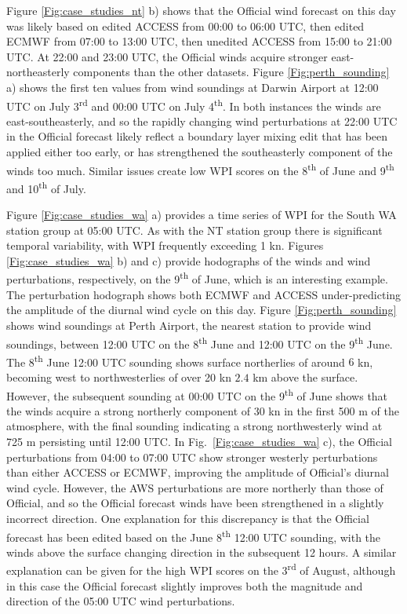 \documentclass[twocol]{ametsoc}
\begin{document}
Figure \ref{Fig:case_studies_nt} b) shows that the Official wind forecast on this day was likely based on edited ACCESS from 00:00 to 06:00 UTC, then edited ECMWF from 07:00 to 13:00 UTC, then unedited ACCESS from 15:00 to 21:00 UTC. At 22:00 and 23:00 UTC, the Official winds acquire stronger east-northeasterly components than the other datasets. Figure \ref{Fig:perth_sounding} a) shows the first ten values from wind soundings at Darwin Airport at 12:00 UTC on July 3\textsuperscript{rd} and 00:00 UTC on July 4\textsuperscript{th}. In both instances the winds are east-southeasterly, and so the rapidly changing wind perturbations at 22:00 UTC in the Official forecast likely reflect a boundary layer mixing edit that has been applied either too early, or has strengthened the southeasterly component of the winds too much. Similar issues create low WPI scores on the 8\textsuperscript{th} of June and 9\textsuperscript{th} and 10\textsuperscript{th} of July.

Figure \ref{Fig:case_studies_wa} a) provides a time series of WPI for the South WA station group at 05:00 UTC. As with the NT station group there is significant temporal variability, with WPI frequently exceeding 1 kn. Figures \ref{Fig:case_studies_wa} b) and c) provide hodographs of the winds and wind perturbations, respectively, on the 9\textsuperscript{th} of June, which is an interesting example. The perturbation hodograph shows both ECMWF and ACCESS under-predicting the amplitude of the diurnal wind cycle on this day. Figure \ref{Fig:perth_sounding} shows wind soundings at Perth Airport, the nearest station to provide wind soundings, between 12:00 UTC on the 8\textsuperscript{th} June and 12:00 UTC on the 9\textsuperscript{th} June. The 8\textsuperscript{th} June 12:00 UTC sounding shows surface northerlies of around $6$ kn, becoming west to northwesterlies of over 20 kn $2.4$ km above the surface. However, the subsequent sounding at 00:00 UTC on the 9\textsuperscript{th} of June shows that the winds acquire a strong northerly component of 30 kn in the first 500 m of the atmosphere, with the final sounding indicating a strong northwesterly wind at 725 m persisting until 12:00 UTC. In Fig.~\ref{Fig:case_studies_wa} c), the Official perturbations from 04:00 to 07:00 UTC show stronger westerly perturbations than either ACCESS or ECMWF, improving the amplitude of Official's diurnal wind cycle. However, the AWS perturbations are more northerly than those of Official, and so the Official forecast winds have been strengthened in a slightly incorrect direction. One explanation for this discrepancy is that the Official forecast has been edited based on the June 8\textsuperscript{th} 12:00 UTC sounding, with the winds above the surface changing direction in the subsequent 12 hours. A similar explanation can be given for the high WPI scores on the  3\textsuperscript{rd} of August, although in this case the Official forecast slightly improves both the magnitude and direction of the 05:00 UTC wind perturbations.
\end{document}
